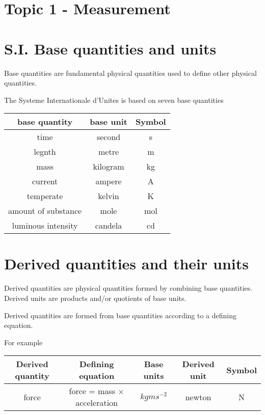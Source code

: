 \documentclass[a4paper, 10pt]{article}
\begin{document}
\section*{Topic 1 - Measurement}

\section{S.I. Base quantities and units}
Base quantities are fundamental physical quantities used to define other physical quantities. 

The Systeme Internationale d'Unites is based on seven base quantities  \\

\begin{center}
   \begin{tabular}{c|c|c}
      \hline 
      base quantity & base unit & Symbol \\
      \hline
      time & second & s \\
      legnth & metre & m \\
      mass & kilogram & kg \\
      current & ampere & A \\
      temperate & kelvin & K \\
      amount of substance & mole & mol \\
      luminous intensity & candela & cd \\
      \hline
   \end{tabular}	
\end{center}	

\section{Derived quantities and their units}
Derived quantities are physical quantities formed by combining base quantities. Derived units are products and/or quotients of base units.

Derived quantities are formed from base quantities according to a defining equation.

For example
\begin{center}
   \begin{tabular}{c|c|c|c|c}
      \hline
      Derived quantity & Defining equation & Base units & Derived unit & Symbol \\
      \hline
      force & force = mass $\times$ acceleration & $kgms^{-2}$ & newton & N \\
      \hline
   \end{tabular}	
\end{center}	
\end{document}
